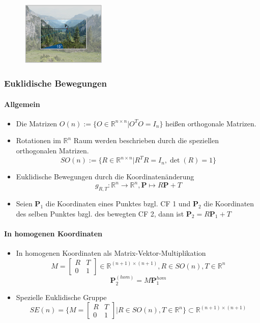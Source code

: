 \documentclass[12pt, a4paper, oneside]{article}
\begin{document}
\begin{figure}[!h]
    \centering
    \includegraphics[width=0.36\textwidth]{../img/2-9.png}
    \label{img/2-9}
\end{figure}


\space
\subsubsection{Euklidische Bewegungen}

\paragraph*{Allgemein}

\begin{itemize}
    \item Die Matrizen $O(n):=\{O\in\mathbb{R}^{n\times n}|O^TO=I_n\}$ heißen orthogonale Matrizen.
    \item Rotationen im $\mathbb{R}^n$ Raum werden beschrieben durch die speziellen orthogonalen Matrizen.
    $$SO(n):=\{R\in\mathbb{R}^{n\times n}|R^TR=I_n, \det (R)=1\}$$
    \item Euklidische Bewegungen durch die Koordinatenänderung $$g_{R,T}:
    \mathbb{R}^n\to\mathbb{R}^n, \mathbf{P}\mapsto R\mathbf{P}+T$$
    \item Seien $\mathbf{P}_1$ die Koordinaten eines Punktes bzgl. 
    CF 1 und $\mathbf{P}_2$ die Koordinaten des selben Punktes bzgl. 
    des bewegten CF 2, dann ist $\mathbf{P}_2=R\mathbf{P}_1+T$
\end{itemize}

\paragraph*{In homogenen Koordinaten}
\begin{itemize}
    \item In homogenen Koordinaten als Matrix-Vektor-Multiplikation
    $$M=\begin{bmatrix}
        R & T \\
        0 & 1
    \end{bmatrix}\in\mathbb{R}^{(n+1)\times(n+1)}, R\in SO(n), T\in \mathbb{R}^n$$
    $$\mathbf{P}_2^{(hom)}=M\mathbf{P}_1^{hom}$$
    \item Spezielle Euklidische Gruppe
    $$SE(n) = \{M=\begin{bmatrix}
        R & T \\
        0 & 1
    \end{bmatrix}|R\in SO(n), T\in\mathbb{R}^n\}\subset\mathbb{R}^{(n+1)\times (n+1)}$$
\end{itemize}
\end{document}
